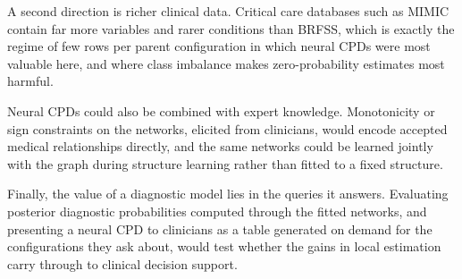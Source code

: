 \documentclass[a4paper,fleqn]{cas-dc}
\begin{document}
A second direction is richer clinical data. Critical care databases such as MIMIC contain far more variables and rarer conditions than BRFSS, which is exactly the regime of few rows per parent configuration in which neural CPDs were most valuable here, and where class imbalance makes zero-probability estimates most harmful.

Neural CPDs could also be combined with expert knowledge. Monotonicity or sign constraints on the networks, elicited from clinicians, would encode accepted medical relationships directly, and the same networks could be learned jointly with the graph during structure learning rather than fitted to a fixed structure.

Finally, the value of a diagnostic model lies in the queries it answers. Evaluating posterior diagnostic probabilities computed through the fitted networks, and presenting a neural CPD to clinicians as a table generated on demand for the configurations they ask about, would test whether the gains in local estimation carry through to clinical decision support.

\clearpage


\end{document}
